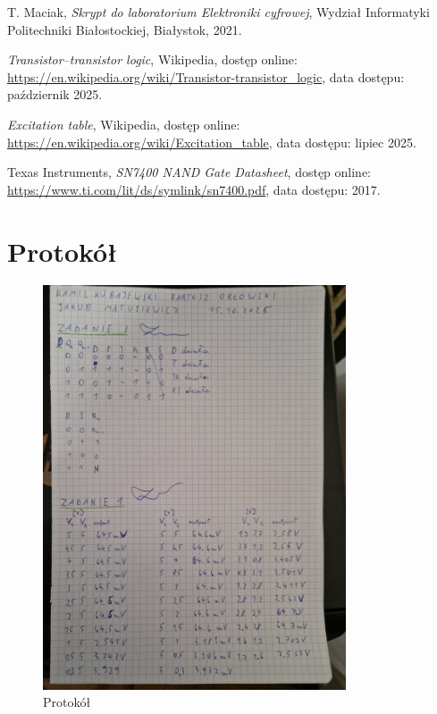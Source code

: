 \documentclass{article}
\begin{document}
\renewcommand{\refname}{}

\begin{thebibliography}{9}
	
	T. Maciak, \textit{Skrypt do laboratorium Elektroniki cyfrowej}, 
	Wydział Informatyki Politechniki Białostockiej, Białystok, 2021.
	
	\textit{Transistor–transistor logic}, Wikipedia, dostęp online: 
	\url{https://en.wikipedia.org/wiki/Transistor-transistor_logic}, 
	data dostępu: październik 2025.
	
	\textit{Excitation table}, Wikipedia, dostęp online: 
	\url{https://en.wikipedia.org/wiki/Excitation_table}, 
	data dostępu: lipiec 2025.
	
	Texas Instruments, \textit{SN7400 NAND Gate Datasheet}, dostęp online: 
	\url{https://www.ti.com/lit/ds/symlink/sn7400.pdf}, 
	data dostępu: 2017.
	
\end{thebibliography}

\pagebreak
\section{Protokół}

\begin{figure}[h]
    \centering
    \includegraphics[width=0.8\textwidth, angle=-90]{protokol.JPG}
    \caption{Protokół}
    \label{fig:moj_obrazek}
\end{figure}
\end{document}
